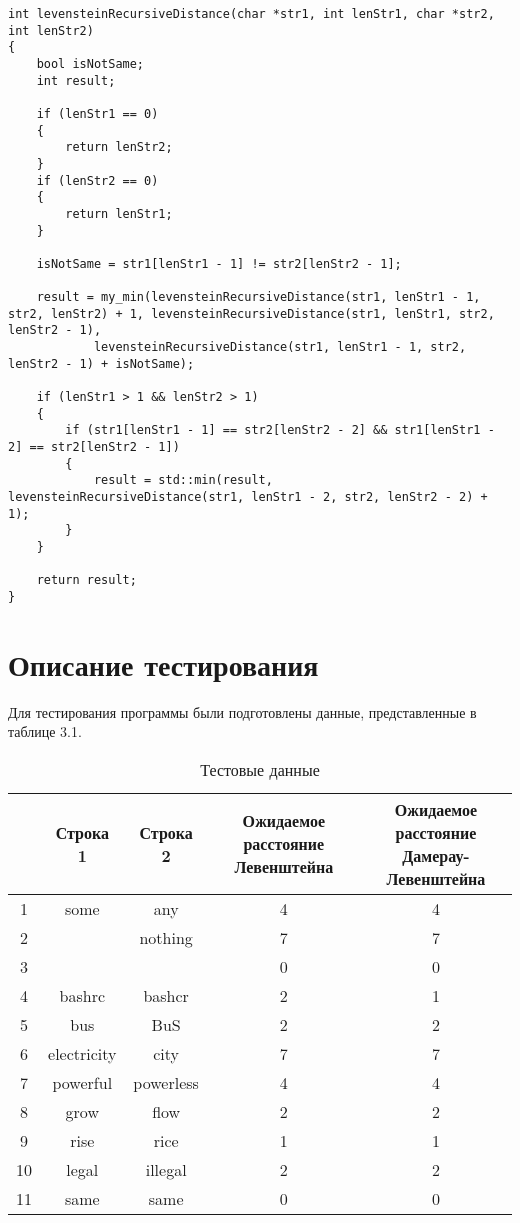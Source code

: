 \noindent\begin{minipage}{\textwidth}
\begin{lstlisting}[caption=Расстояние Левенштейна (рекурсивная Дамерау-Левенштейна реализация)]
int levensteinRecursiveDistance(char *str1, int lenStr1, char *str2, int lenStr2)
{
    bool isNotSame;
    int result;

    if (lenStr1 == 0)
    {
        return lenStr2;
    }
    if (lenStr2 == 0)
    {
        return lenStr1;
    }

    isNotSame = str1[lenStr1 - 1] != str2[lenStr2 - 1];

    result = my_min(levensteinRecursiveDistance(str1, lenStr1 - 1, str2, lenStr2) + 1, levensteinRecursiveDistance(str1, lenStr1, str2, lenStr2 - 1),
            levensteinRecursiveDistance(str1, lenStr1 - 1, str2, lenStr2 - 1) + isNotSame);

    if (lenStr1 > 1 && lenStr2 > 1)
    {
        if (str1[lenStr1 - 1] == str2[lenStr2 - 2] && str1[lenStr1 - 2] == str2[lenStr2 - 1])
        {
            result = std::min(result, levensteinRecursiveDistance(str1, lenStr1 - 2, str2, lenStr2 - 2) + 1);
        }
    }

    return result;
}
\end{lstlisting}
\end{minipage}

\section{Описание тестирования}
Для тестирования программы были подготовлены данные, представленные в таблице 3.1.

\begin{table}[H]
    \caption{Тестовые данные}
	\begin{tabular}{|c|c|c|c|c|}
 	\hline
\No{} & Строка 1 & Строка 2 & \makecell{Ожидаемое расстояние\\Левенштейна} & \makecell{Ожидаемое расстояние\\Дамерау-Левенштейна} \\
 	\hline
 	1 & some & any & 4 & 4\\
 	\hline
 	2 & & nothing & 7 & 7\\
 	\hline
 	3 & & & 0 & 0\\
 	\hline
 	4 & bashrc & bashcr & 2 & 1\\
 	\hline
 	5 & bus & BuS & 2 & 2\\
 	\hline
 	6 & electricity & city & 7 & 7\\
 	\hline
 	7 & powerful & powerless & 4 & 4\\
 	\hline
 	8 & grow & flow & 2 & 2\\
 	\hline
 	9 & rise & rice & 1 & 1\\
 	\hline
    10 & legal & illegal & 2 & 2\\
 	\hline
    11 & same & same & 0 & 0\\
    \hline
	\end{tabular}
\end{table}

